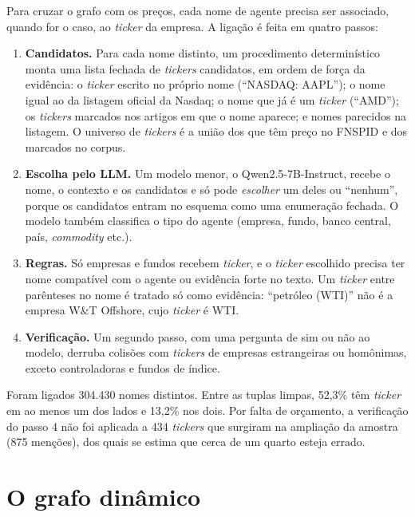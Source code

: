 Para cruzar o grafo com os preços, cada nome de agente precisa ser associado, quando for o caso, ao
\emph{ticker} da empresa. A ligação é feita em quatro passos:
\begin{enumerate}
  \item \textbf{Candidatos.} Para cada nome distinto, um procedimento determinístico monta uma lista
        fechada de \emph{tickers} candidatos, em ordem de força da evidência: o \emph{ticker} escrito no
        próprio nome (``NASDAQ: AAPL''); o nome igual ao da listagem oficial da Nasdaq; o nome que já é
        um \emph{ticker} (``AMD''); os \emph{tickers} marcados nos artigos em que o nome aparece; e nomes
        parecidos na listagem. O universo de \emph{tickers} é a união dos que têm preço no FNSPID e dos
        marcados no corpus.
  \item \textbf{Escolha pelo LLM.} Um modelo menor, o Qwen2.5-7B-Instruct, recebe o nome, o contexto e os
        candidatos e só pode \emph{escolher} um deles ou ``nenhum'', porque os candidatos entram no
        esquema como uma enumeração fechada. O modelo também classifica o tipo do agente (empresa,
        fundo, banco central, país, \emph{commodity} etc.).
  \item \textbf{Regras.} Só empresas e fundos recebem \emph{ticker}, e o \emph{ticker} escolhido precisa
        ter nome compatível com o agente ou evidência forte no texto. Um \emph{ticker} entre parênteses
        no nome é tratado só como evidência: ``petróleo (WTI)'' não é a empresa W\&T Offshore, cujo
        \emph{ticker} é WTI.
  \item \textbf{Verificação.} Um segundo passo, com uma pergunta de sim ou não ao modelo, derruba
        colisões com \emph{tickers} de empresas estrangeiras ou homônimas, exceto controladoras e fundos
        de índice.
\end{enumerate}

Foram ligados 304.430 nomes distintos. Entre as tuplas limpas, 52,3\% têm \emph{ticker} em ao menos um
dos lados e 13,2\% nos dois. Por falta de orçamento, a verificação do passo 4 não foi aplicada a 434
\emph{tickers} que surgiram na ampliação da amostra (875 menções), dos quais se estima que cerca de um
quarto esteja errado.

\section{O grafo dinâmico}
\label{sec:grafo}

